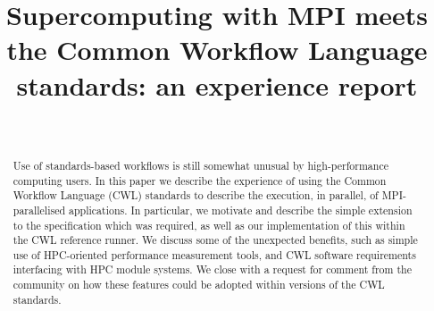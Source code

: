 \documentclass[conference]{IEEEtran}
\begin{document}
\title{Supercomputing with MPI meets the Common Workflow Language standards: an experience report}


\author{\\
}

\maketitle

\begin{abstract}
Use of standards-based workflows is still somewhat unusual by high-performance computing users. In this paper we describe the experience of using the Common Workflow Language (CWL) standards to describe the execution, in parallel, of MPI-parallelised applications. In particular, we motivate and describe the simple extension to the specification which was required, as well as our implementation of this within the CWL reference runner. We discuss some of the unexpected benefits, such as simple use of HPC-oriented performance measurement tools, and CWL software requirements interfacing with HPC module systems. We close with a request for comment from the community on how these features could be adopted within versions of the CWL standards.
\end{abstract}

\end{document}
